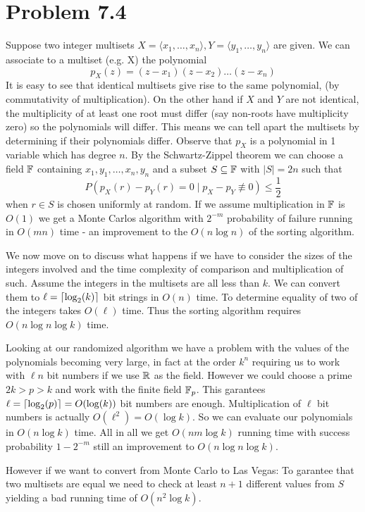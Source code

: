 \section{Problem 7.4}

Suppose two integer multisets
$X=\langle x_1, \dots, x_n\rangle,Y=\langle y_1, \dots, y_n \rangle$ are given.
We can associate to a multiset (e.g. X) the polynomial
\[ p_X(z) = (z - x_1)(z - x_2) \dots (z - x_n) \]
It is easy to see that identical multisets give rise to the same polynomial,
(by commutativity of multiplication).
On the other hand if $X$ and $Y$ are not identical,
the multiplicity of at least one root must differ
(say non-roots have multiplicity zero) so the polynomials will differ.
This means we can tell apart the multisets by determining if their polynomials differ.
Observe that $p_X$ is a polynomial in 1 variable which has degree $n$.
By the Schwartz-Zippel theorem we can choose a field $\mathbb{F}$
containing $x_1, y_1, \dots, x_n, y_n$
and a subset $S \subseteq \mathbb{F}$ with $|S|=2n$ 
such that
\[ P(p_X(r) - p_Y(r) = 0 \mid p_X - p_Y \not \equiv 0) \leq \frac{1}{2} \]
when $r \in S$ is chosen uniformly at random.
If we assume multiplication in $\mathbb{F}$ is $O(1)$
we get a Monte Carlos algorithm with $2^{-m}$ probability of failure
running in $O(m n)$ time
- an improvement to the $O(n \log n)$ of the sorting algorithm.

We now move on to discuss what happens if we have to consider
the sizes of the integers involved and
the time complexity of comparison and multiplication of such.
Assume the integers in the multisets are all less than $k$.
We can convert them to $\ell = \lceil\log_2 (k) \rceil$ bit strings in $O(n)$ time.
To determine equality of two of the integers takes $O(\ell)$ time. 
Thus the sorting algorithm requires $O(n \log n \log k)$ time.

Looking at our randomized algorithm we have a problem with the values of the
polynomials becoming very large,
in fact at the order $k^n$ requiring us to work with $\ell n$ bit numbers
if we use $\mathbb{R}$ as the field.
However we could choose a prime $2k>p>k$ and work with the finite field $\mathbb{F}_p$.
This garantees $\ell = \lceil\log_2 (p)\rceil = O(\log(k))$ bit numbers are enough.
Multiplication of $\ell$ bit numbers is actually $O(\ell^2) = O(\log k)$.
So we can evaluate our polynomials in $O(n \log k)$ time.
All in all we get $O(n m \log k)$ running time
with success probability $1 - 2^{-m}$ still an improvement to $O(n \log n \log k)$.

However if we want to convert from Monte Carlo to Las Vegas:
To garantee that two multisets are equal we need to check at least $n+1$
different values from $S$ yielding a bad running time of
$O(n^2 \log k)$.
